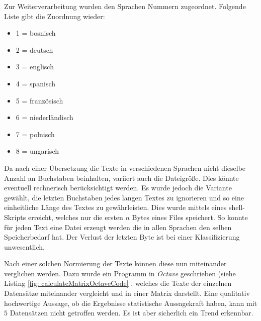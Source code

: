 \documentclass[12pt,german]{article}
\begin{document}
Zur Weiterverarbeitung wurden den Sprachen Nummern zugeordnet. Folgende Liste gibt die Zuordnung wieder:

\begin{itemize}
	\item 1 = bosnisch
	\item 2 = deutsch
	\item 3 = englisch
	\item 4 = spanisch
	\item 5 = französisch
	\item 6 = niederländisch
	\item 7 = polnisch
	\item 8 = ungarisch
\end{itemize}

Da nach einer Übersetzung die Texte in verschiedenen Sprachen nicht dieselbe Anzahl an Buchstaben beinhalten, variiert auch die Dateigröße. Dies könnte eventuell rechnerisch berücksichtigt werden. Es wurde jedoch die Variante gewählt, die letzten Buchstaben jedes langen Textes zu ignorieren und so eine einheitliche Länge des Textes zu gewährleisten. Dies wurde mittels eines shell-Skripts erreicht, welches nur die ersten $n$ Bytes eines Files speichert. So konnte für jeden Text eine Datei erzeugt werden die in allen Sprachen den selben Speicherbedarf hat. Der Verlust der letzten Byte ist bei einer Klassifizierung unwesentlich. 



Nach einer solchen Normierung der Texte können diese nun miteinander verglichen werden. Dazu wurde ein Programm in \textit{Octave} geschrieben (siehe Listing \ref{fig: calculateMatrixOctaveCode}  , welches die Texte der einzelnen Datensätze miteinander vergleicht und in einer Matrix darstellt. Eine qualitativ hochwertige Aussage, ob die Ergebnisse statistische Aussagekraft haben, kann mit $5$ Datensätzen nicht getroffen werden. Es ist aber sicherlich ein Trend erkennbar.
\end{document}
